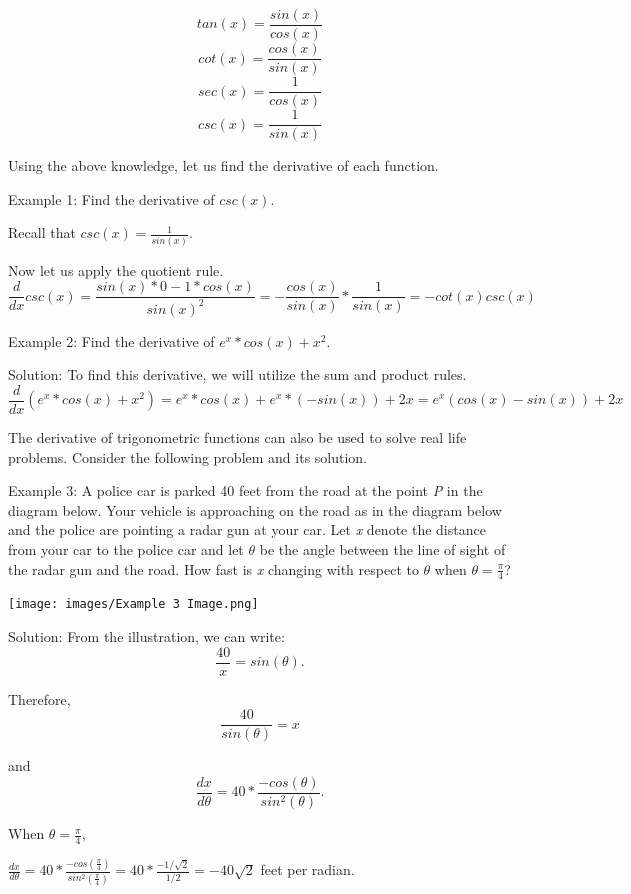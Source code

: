 \documentclass[
  letterpaper,
  DIV=11,
  numbers=noendperiod]{scrartcl}
\begin{document}
\[tan(x)=\frac{sin(x)}{cos(x)}\] \[cot(x)=\frac{cos(x)}{sin(x)}\]
\[sec(x)=\frac{1}{cos(x)}\] \[csc(x)=\frac{1}{sin(x)}\]

Using the above knowledge, let us find the derivative of each function.

Example 1: Find the derivative of \(csc(x).\)

Recall that \(csc(x)=\frac{1}{sin(x)}.\)

Now let us apply the quotient rule.
\[\frac{d}{dx}csc(x)=\frac{sin(x)*0-1*cos(x)}{sin(x)^2}=-\frac{cos(x)}{sin(x)}*\frac{1}{sin(x)}=-cot(x)csc(x)\]

Example 2: Find the derivative of \(e^x*cos(x)+x^2.\)

Solution: To find this derivative, we will utilize the sum and product
rules.
\[\frac{d}{dx}(e^x*cos(x)+x^2)=e^x*cos(x)+e^x*(-sin(x))+2x=e^x(cos(x)-sin(x))+2x\]

The derivative of trigonometric functions can also be used to solve real
life problems. Consider the following problem and its solution.

Example 3: A police car is parked 40 feet from the road at the point
\emph{P} in the diagram below. Your vehicle is approaching on the road
as in the diagram below and the police are pointing a radar gun at your
car. Let \emph{x} denote the distance from your car to the police car
and let \(\theta\) be the angle between the line of sight of the radar
gun and the road. How fast is \emph{x} changing with respect to
\(\theta\) when \(\theta=\frac{\pi}{4}\)?

\begin{center}
\texttt{[image: images/Example 3 Image.png]}
\end{center}

Solution: From the illustration, we can write:
\[\frac{40}{x}=sin(\theta).\]

Therefore, \[\frac{40}{sin(\theta)}=x\]

and \[\frac{dx}{d\theta}=40*\frac{-cos(\theta)}{sin^2(\theta)}.\]

When \(\theta=\frac{\pi}{4},\)

\(\frac{dx}{d\theta}=40*\frac{-cos(\frac{\pi}{4})}{sin^2(\frac{\pi}{4})}=40*\frac{-1/\sqrt2}{1/2}=-40\sqrt2\)
feet per radian.
\end{document}
